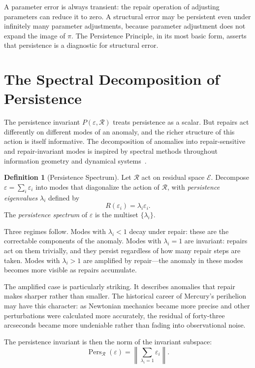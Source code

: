 \documentclass[12pt,oneside]{book}
\theoremstyle{plain}
\theoremstyle{definition}
\newtheorem{definition}[theorem]{Definition}
\theoremstyle{remark}
\DeclareMathOperator{\Pers}{Pers}
\newcommand{\R}{\mathcal{R}}
\newcommand{\eps}{\varepsilon}
\newcommand{\1}{\mathbf{1}}
\begin{document}
A parameter error is always transient: the repair operation of adjusting parameters can reduce it to zero. A structural error may be persistent even under infinitely many parameter adjustments, because parameter adjustment does not expand the image of $\pi$. The Persistence Principle, in its most basic form, asserts that persistence is a diagnostic for structural error.

\section{The Spectral Decomposition of Persistence}

The persistence invariant $P(\eps, \R)$ treats persistence as a scalar. But repairs act differently on different modes of an anomaly, and the richer structure of this action is itself informative. The decomposition of anomalies into repair-sensitive and repair-invariant modes is inspired by spectral methods throughout information geometry and dynamical systems~\cite{amari2016,gromov1999}.

\begin{definition}[Persistence Spectrum]
Let $\R$ act on residual space $\mathcal{E}$. Decompose $\eps = \sum_i \eps_i$ into modes that diagonalize the action of $\R$, with \emph{persistence eigenvalues} $\lambda_i$ defined by
\[
R(\eps_i) = \lambda_i \eps_i.
\]
The \emph{persistence spectrum} of $\eps$ is the multiset $\{\lambda_i\}$.
\end{definition}

Three regimes follow. Modes with $\lambda_i < 1$ decay under repair: these are the correctable components of the anomaly. Modes with $\lambda_i = 1$ are invariant: repairs act on them trivially, and they persist regardless of how many repair steps are taken. Modes with $\lambda_i > 1$ are amplified by repair---the anomaly in these modes becomes more visible as repairs accumulate.

The amplified case is particularly striking. It describes anomalies that repair makes sharper rather than smaller. The historical career of Mercury's perihelion may have this character: as Newtonian mechanics became more precise and other perturbations were calculated more accurately, the residual of forty-three arcseconds became more undeniable rather than fading into observational noise.

The persistence invariant is then the norm of the invariant subspace:
\[
\Pers_{\R}(\eps) = \left\|\sum_{\lambda_i = 1} \eps_i\right\|.
\]
\end{document}
